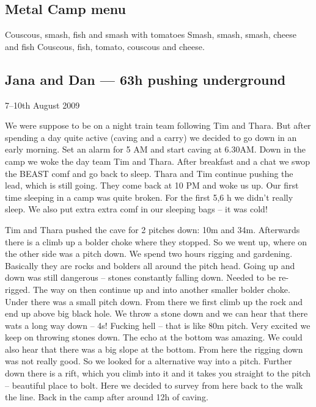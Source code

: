 
\hypertarget{metal-camp-menu}{%
\subsection{Metal Camp menu}\label{metal-camp-menu}}

Couscous, smash, fish and smash with tomatoes Smash, smash, smash,
cheese and fish Couscous, fish, tomato, couscous and cheese.


\hypertarget{jana-and-dan-63h-pushing-underground}{%
\subsection{Jana and Dan --- 63h pushing
underground}\label{jana-and-dan-63h-pushing-underground}}

7--10th August 2009

We were suppose to be on a night train team following Tim and Thara. But
after spending a day quite active (caving and a carry) we decided to go
down in an early morning. Set an alarm for 5 AM and start caving at
6.30AM. Down in the camp we woke the day team Tim and Thara. After
breakfast and a chat we swop the BEAST comf and go back to sleep. Thara
and Tim continue pushing the lead, which is still going. They come back
at 10 PM and woke us up. Our first time sleeping in a camp was quite
broken. For the first 5,6 h we didn't really sleep. We also put extra
extra comf in our sleeping bags -- it was cold!

Tim and Thara pushed the cave for 2 pitches down: 10m and 34m.
Afterwards there is a climb up a bolder choke where they stopped. So we
went up, where on the other side was a pitch down. We spend two hours
rigging and gardening. Basically they are rocks and bolders all around
the pitch head. Going up and down was still dangerous -- stones
constantly falling down. Needed to be re-rigged. The way on then
continue up and into another smaller bolder choke. Under there was a
small pitch down. From there we first climb up the rock and end up above
big black hole. We throw a stone down and we can hear that there wats a
long way down -- 4s! Fucking hell -- that is like 80m pitch. Very
excited we keep on throwing stones down. The echo at the bottom was
amazing. We could also hear that there was a big slope at the bottom.
From here the rigging down was not really good. So we looked for a
alternative way into a pitch. Further down there is a rift, which you
climb into it and it takes you straight to the pitch -- beautiful place
to bolt. Here we decided to survey from here back to the walk the line.
Back in the camp after around 12h of caving.

